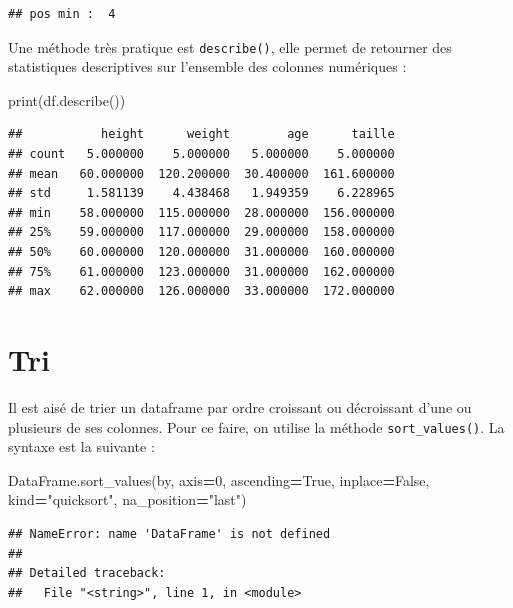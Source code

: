 \documentclass[12pt,]{book}
\newenvironment{Shaded}{\begin{snugshade}}{\end{snugshade}}
\newcommand{\DecValTok}[1]{\textcolor[rgb]{0.00,0.00,0.81}{#1}}
\newcommand{\StringTok}[1]{\textcolor[rgb]{0.31,0.60,0.02}{#1}}
\newcommand{\VariableTok}[1]{\textcolor[rgb]{0.00,0.00,0.00}{#1}}
\newcommand{\OperatorTok}[1]{\textcolor[rgb]{0.81,0.36,0.00}{\textbf{#1}}}
\newcommand{\BuiltInTok}[1]{#1}
\newcommand{\NormalTok}[1]{#1}
\numberwithin{equation}{section}
\numberwithin{countremarque}{section}
\begin{document}
\begin{lstlisting}
## pos min :  4
\end{lstlisting}

Une méthode très pratique est \texttt{describe()}, elle permet de
retourner des statistiques descriptives sur l'ensemble des colonnes
numériques :

\begin{Shaded}
\begin{Highlighting}[]
\BuiltInTok{print}\NormalTok{(df.describe())}
\end{Highlighting}
\end{Shaded}

\begin{lstlisting}
##           height      weight        age      taille
## count   5.000000    5.000000   5.000000    5.000000
## mean   60.000000  120.200000  30.400000  161.600000
## std     1.581139    4.438468   1.949359    6.228965
## min    58.000000  115.000000  28.000000  156.000000
## 25%    59.000000  117.000000  29.000000  158.000000
## 50%    60.000000  120.000000  31.000000  160.000000
## 75%    61.000000  123.000000  31.000000  162.000000
## max    62.000000  126.000000  33.000000  172.000000
\end{lstlisting}

\section{Tri}\label{tri-2}

Il est aisé de trier un dataframe par ordre croissant ou décroissant
d'une ou plusieurs de ses colonnes. Pour ce faire, on utilise la méthode
\texttt{sort\_values()}. La syntaxe est la suivante :

\begin{Shaded}
\begin{Highlighting}[]
\NormalTok{DataFrame.sort_values(by, axis}\OperatorTok{=}\DecValTok{0}\NormalTok{, ascending}\OperatorTok{=}\VariableTok{True}\NormalTok{,}
\NormalTok{                      inplace}\OperatorTok{=}\VariableTok{False}\NormalTok{, kind}\OperatorTok{=}\StringTok{"quicksort"}\NormalTok{,}
\NormalTok{                      na_position}\OperatorTok{=}\StringTok{"last"}\NormalTok{)}
\end{Highlighting}
\end{Shaded}

\begin{lstlisting}
## NameError: name 'DataFrame' is not defined
## 
## Detailed traceback: 
##   File "<string>", line 1, in <module>
\end{lstlisting}
\end{document}
